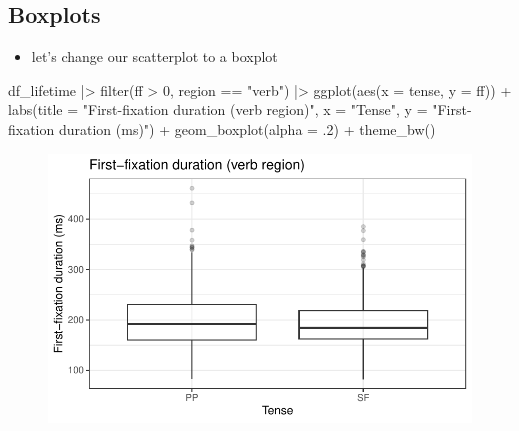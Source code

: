 \documentclass[
  letterpaper,
  DIV=11,
  numbers=noendperiod]{scrartcl}
\newenvironment{Shaded}{\begin{snugshade}}{\end{snugshade}}
\newcommand{\AttributeTok}[1]{\textcolor[rgb]{0.40,0.45,0.13}{#1}}
\newcommand{\DecValTok}[1]{\textcolor[rgb]{0.68,0.00,0.00}{#1}}
\newcommand{\FunctionTok}[1]{\textcolor[rgb]{0.28,0.35,0.67}{#1}}
\newcommand{\NormalTok}[1]{\textcolor[rgb]{0.00,0.23,0.31}{#1}}
\newcommand{\SpecialCharTok}[1]{\textcolor[rgb]{0.37,0.37,0.37}{#1}}
\newcommand{\StringTok}[1]{\textcolor[rgb]{0.13,0.47,0.30}{#1}}
\providecommand{\tightlist}{%
  \setlength{\itemsep}{0pt}\setlength{\parskip}{0pt}}\usepackage{longtable,booktabs,array}
\begin{document}
\hypertarget{boxplots-1}{%
\subsection{Boxplots}\label{boxplots-1}}

\begin{itemize}
\tightlist
\item
  let's change our scatterplot to a boxplot
\end{itemize}

\begin{Shaded}
\begin{Highlighting}[numbers=left,,]
\NormalTok{df\_lifetime }\SpecialCharTok{|\textgreater{}}
  \FunctionTok{filter}\NormalTok{(ff }\SpecialCharTok{\textgreater{}} \DecValTok{0}\NormalTok{,}
\NormalTok{         region }\SpecialCharTok{==} \StringTok{"verb"}\NormalTok{) }\SpecialCharTok{|\textgreater{}}
  \FunctionTok{ggplot}\NormalTok{(}\FunctionTok{aes}\NormalTok{(}\AttributeTok{x =}\NormalTok{ tense, }\AttributeTok{y =}\NormalTok{ ff)) }\SpecialCharTok{+}
  \FunctionTok{labs}\NormalTok{(}\AttributeTok{title =} \StringTok{"First{-}fixation duration (verb region)"}\NormalTok{,}
       \AttributeTok{x =} \StringTok{"Tense"}\NormalTok{,}
       \AttributeTok{y =} \StringTok{"First{-}fixation duration (ms)"}\NormalTok{) }\SpecialCharTok{+}
  \FunctionTok{geom\_boxplot}\NormalTok{(}\AttributeTok{alpha =}\NormalTok{ .}\DecValTok{2}\NormalTok{) }\SpecialCharTok{+}
  \FunctionTok{theme\_bw}\NormalTok{()}
\end{Highlighting}
\end{Shaded}

\begin{figure}[H]

{\centering \includegraphics{_data_viz_files/figure-pdf/unnamed-chunk-30-1.pdf}

}

\end{figure}
\end{document}

